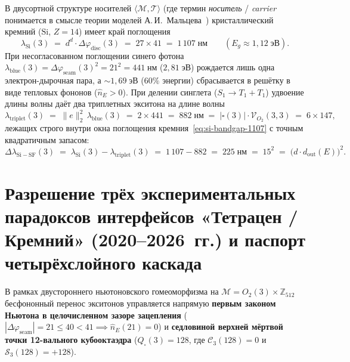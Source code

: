 \documentclass[11pt,a4paper]{article}
\theoremstyle{plain}
\theoremstyle{definition}
\begin{document}
В двусортной структуре носителей $\langle\mathcal{M},\mathcal{T}\rangle$ (где термин \emph{носитель} / \emph{carrier} понимается в смысле теории моделей А.\,И.~Мальцева~\cite{Malcev1970}) кристаллический кремний ($\mathrm{Si}$, $Z = 14$) имеет край поглощения
\begin{equation}
  \label{eq:si-bandgap-1107}
  \lambda_{\mathrm{Si}}(3) \;=\; d^d\cdot\Delta\varphi_{\mathrm{disc}}(3) \;=\; 27\times 41 \;=\; 1\,107\;\text{нм} \qquad (E_g\approx 1{,}12\;\text{эВ}).
\end{equation}
При несогласованном поглощении синего фотона $\lambda_{\mathrm{blue}}(3) = \Delta\varphi_{\mathrm{seam}}(3)^2 = 21^2 = 441\;\text{нм}$ ($2{,}81\;\text{эВ}$) рождается лишь одна электрон-дырочная пара, а $\sim 1{,}69\;\text{эВ}$ ($60\%$ энергии) сбрасывается в решётку в виде тепловых фононов ($\hat{n}_E > 0$). При делении синглета ($S_1\to T_1 + T_1$) удвоение длины волны даёт два триплетных экситона на длине волны
\begin{equation}
  \label{eq:triplet-882}
  \lambda_{\mathrm{triplet}}(3) \;=\; \|e\|_2^2\,\lambda_{\mathrm{blue}}(3) \;=\; 2\times 441 \;=\; 882\;\text{нм} \;=\; |\square(3)|\cdot\mathcal{V}_{O_2}(3,3) \;=\; 6\times 147,
\end{equation}
лежащих строго внутри окна поглощения кремния~\eqref{eq:si-bandgap-1107} с точным квадратичным запасом:
\begin{equation}
  \label{eq:sf-margin-225}
  \Delta\lambda_{\mathrm{Si-SF}}(3) \;=\; \lambda_{\mathrm{Si}}(3) - \lambda_{\mathrm{triplet}}(3) \;=\; 1\,107 - 882 \;=\; 225\;\text{нм} \;=\; 15^2 \;=\; \bigl(d\cdot d_{\mathrm{out}}(E)\bigr)^2.
\end{equation}

\section{Разрешение трёх экспериментальных парадоксов интерфейсов «Тетрацен / Кремний» (2020--2026~гг.) и паспорт четырёхслойного каскада}
\label{sec:three-paradoxes}

В рамках двустороннего ньютоновского гомеоморфизма на $\mathcal{M} = O_2(3)\times\mathbb{Z}_{512}$ бесфононный перенос экситонов управляется напрямую \textbf{первым законом Ньютона в целочисленном зазоре зацепления} ($|\Delta\varphi_{\mathrm{seam}}| = 21 \le 40 < 41 \implies \hat{n}_E(21) = 0$) и \textbf{седловиной верхней мёртвой точки 12-вального кубооктаэдра} ($Q_\square(3) = 128$, где $\mathcal{C}_3(128) = 0$ и $\mathcal{S}_3(128) = +128$).
\end{document}
